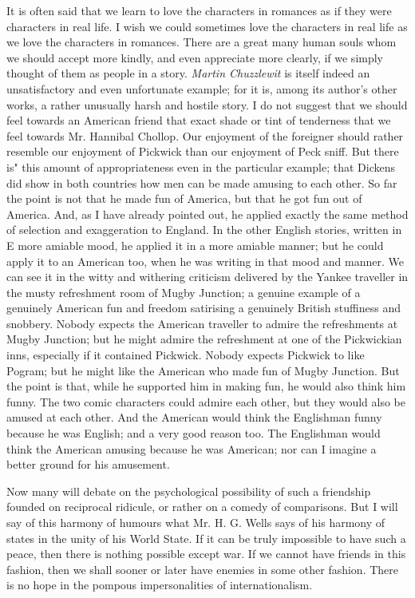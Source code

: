 \documentclass{book}
\begin{document}
It is often said that we learn to love the characters in romances as if they were characters in real life. I wish we could sometimes love the characters in real life as we love the characters in romances. There are a great many human souls whom we should accept more kindly, and even appreciate more clearly, if we simply thought of them as people in a story. \emph{Martin Chuzzlewit} is itself indeed an unsatisfactory and even unfortunate example; for it is, among its author’s other works, a rather unusually harsh and hostile story. I do not suggest that we should feel towards an American friend that exact shade or tint of tenderness that we feel towards Mr. Hannibal Chollop. Our enjoyment of the foreigner should rather resemble our enjoyment of Pickwick than our enjoyment of Peck sniff. But there is" this amount of appropriateness even in the particular example; that Dickens did show in both countries how men can be made amusing to each other. So far the point is not that he made fun of America, but that he got fun out of America. And, as I have already pointed out, he applied exactly the same method of selection and exaggeration to England. In the other English stories, written in E more amiable mood, he applied it in a more amiable manner; but he could apply it to an American too, when he was writing in that mood and manner. We can see it in the witty and withering criticism delivered by the Yankee traveller in the musty refreshment room of Mugby Junction; a genuine example of a genuinely American fun and freedom satirising a genuinely British stuffiness and snobbery. Nobody expects the American traveller to admire the refreshments at Mugby Junction; but he might admire the refreshment at one of the Pickwickian inns, especially if it contained Pickwick. Nobody expects Pickwick to like Pogram; but he might like the American who made fun of Mugby Junction. But the point is that, while he supported him in making fun, he would also think him funny. The two comic characters could admire each other, but they would also be amused at each other. And the American would think the Englishman funny because he was English; and a very good reason too. The Englishman would think the American amusing because he was American; nor can I imagine a better ground for his amusement.

Now many will debate on the psychological possibility of such a friendship founded on reciprocal ridicule, or rather on a comedy of comparisons. But I will say of this harmony of humours what Mr. H. G. Wells says of his harmony of states in the unity of his World State. If it can be truly impossible to have such a peace, then there is nothing possible except war. If we cannot have friends in this fashion, then we shall sooner or later have enemies in some other fashion. There is no hope in the pompous impersonalities of internationalism.
\end{document}
